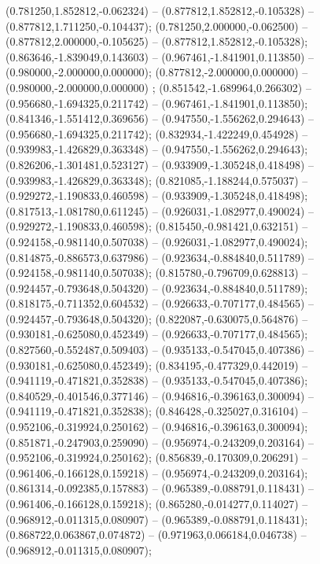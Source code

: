  (0.781250,1.852812,-0.062324) -- (0.877812,1.852812,-0.105328) -- (0.877812,1.711250,-0.104437);
 (0.781250,2.000000,-0.062500) -- (0.877812,2.000000,-0.105625) -- (0.877812,1.852812,-0.105328);
 (0.863646,-1.839049,0.143603) -- (0.967461,-1.841901,0.113850) -- (0.980000,-2.000000,0.000000);
 (0.877812,-2.000000,0.000000) -- (0.980000,-2.000000,0.000000) ;
 (0.851542,-1.689964,0.266302) -- (0.956680,-1.694325,0.211742) -- (0.967461,-1.841901,0.113850);
 (0.841346,-1.551412,0.369656) -- (0.947550,-1.556262,0.294643) -- (0.956680,-1.694325,0.211742);
 (0.832934,-1.422249,0.454928) -- (0.939983,-1.426829,0.363348) -- (0.947550,-1.556262,0.294643);
 (0.826206,-1.301481,0.523127) -- (0.933909,-1.305248,0.418498) -- (0.939983,-1.426829,0.363348);
 (0.821085,-1.188244,0.575037) -- (0.929272,-1.190833,0.460598) -- (0.933909,-1.305248,0.418498);
 (0.817513,-1.081780,0.611245) -- (0.926031,-1.082977,0.490024) -- (0.929272,-1.190833,0.460598);
 (0.815450,-0.981421,0.632151) -- (0.924158,-0.981140,0.507038) -- (0.926031,-1.082977,0.490024);
 (0.814875,-0.886573,0.637986) -- (0.923634,-0.884840,0.511789) -- (0.924158,-0.981140,0.507038);
 (0.815780,-0.796709,0.628813) -- (0.924457,-0.793648,0.504320) -- (0.923634,-0.884840,0.511789);
 (0.818175,-0.711352,0.604532) -- (0.926633,-0.707177,0.484565) -- (0.924457,-0.793648,0.504320);
 (0.822087,-0.630075,0.564876) -- (0.930181,-0.625080,0.452349) -- (0.926633,-0.707177,0.484565);
 (0.827560,-0.552487,0.509403) -- (0.935133,-0.547045,0.407386) -- (0.930181,-0.625080,0.452349);
 (0.834195,-0.477329,0.442019) -- (0.941119,-0.471821,0.352838) -- (0.935133,-0.547045,0.407386);
 (0.840529,-0.401546,0.377146) -- (0.946816,-0.396163,0.300094) -- (0.941119,-0.471821,0.352838);
 (0.846428,-0.325027,0.316104) -- (0.952106,-0.319924,0.250162) -- (0.946816,-0.396163,0.300094);
 (0.851871,-0.247903,0.259090) -- (0.956974,-0.243209,0.203164) -- (0.952106,-0.319924,0.250162);
 (0.856839,-0.170309,0.206291) -- (0.961406,-0.166128,0.159218) -- (0.956974,-0.243209,0.203164);
 (0.861314,-0.092385,0.157883) -- (0.965389,-0.088791,0.118431) -- (0.961406,-0.166128,0.159218);
 (0.865280,-0.014277,0.114027) -- (0.968912,-0.011315,0.080907) -- (0.965389,-0.088791,0.118431);
 (0.868722,0.063867,0.074872) -- (0.971963,0.066184,0.046738) -- (0.968912,-0.011315,0.080907);
